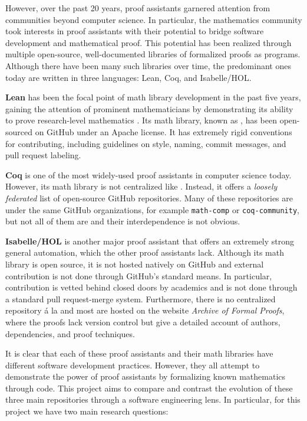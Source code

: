 \documentclass[sigconf,nonacm]{acmart}
\begin{document}
However, over the past 20 years, proof assistants garnered attention from communities beyond computer science. In particular, the mathematics community took interests in proof assistants with their potential to bridge software development and mathematical proof. This potential has been realized through multiple open-source, well-documented libraries of formalized proofs as programs. Although there have been many such libraries over time, the predominant ones today are written in three languages: Lean, Coq, and Isabelle/HOL.

\textbf{Lean} has been the focal point of math library development in the past five years, gaining the attention of prominent mathematicians by demonstrating its ability to prove research-level mathematics \cite{buzzard_2020}. Its math library, known as \mathlib, has been open-sourced on GitHub under an Apache license. It has extremely rigid conventions for contributing, including guidelines on style, naming, commit messages, and pull request labeling. 

\textbf{Coq} is one of the most widely-used proof assistants in computer science today. However, its math library is not centralized like \mathlib. Instead, it offers a \textit{loosely federated} list of open-source GitHub repositories. Many of these repositories are under the same GitHub organizations, for example \texttt{math-comp} or \texttt{coq-community}, but not all of them are and their interdependence is not obvious.

\textbf{Isabelle/HOL} is another major proof assistant that offers an extremely strong general automation, which the other proof assistants lack. Although its math library is open source, it is not hosted natively on GitHub and external contribution is not done through GitHub's standard means. In particular, contribution is vetted behind closed doors by academics and is not done through a standard pull request-merge system. Furthermore, there is no centralized repository \'a la \mathlib and most are hosted on the website \textit{Archive of Formal Proofs}, where the proofs lack version control but give a detailed account of authors, dependencies, and proof techniques.

It is clear that each of these proof assistants and their math libraries have different software development practices. However, they all attempt to demonstrate the power of proof assistants by formalizing known mathematics through code. This project aims to compare and contrast the evolution of these three main repositories through a software engineering lens. In particular, for this project we have two main research questions:
\end{document}
